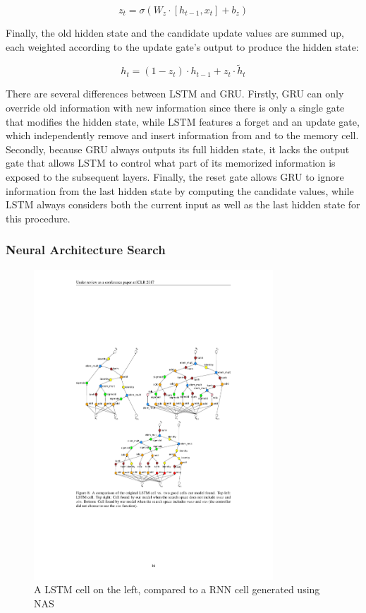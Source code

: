 \documentclass[11pt,a4paper,twoside,openright]{scrbook}
\begin{document}
\begin{equation}
z_t = \sigma (W_z \cdot [h_{t-1}, x_t] + b_z)
\end{equation}

Finally, the old hidden state and the candidate update values are summed up, each weighted according to the update gate’s output to produce the hidden state:

\begin{equation}
h_t = (1 - z_t) \cdot h_{t-1} + z_t \cdot \tilde h_t
\end{equation}

There are several differences between LSTM and GRU. Firstly, GRU can only override old information with new information since there is only a single gate that modifies the hidden state, while LSTM features a forget and an update gate, which independently remove and insert information from and to the memory cell. Secondly, because GRU always outputs its full hidden state, it lacks the output gate that allows LSTM to control what part of its memorized information is exposed to the subsequent layers. Finally, the reset gate allows GRU to ignore information from the last hidden state by computing the candidate values, while LSTM always considers both the current input as well as the last hidden state for this procedure.

\subsubsection{Neural Architecture Search}

\begin{figure}
\centering
\includegraphics[width=0.8\textwidth]{images/NAS.pdf}
\caption{A LSTM cell on the left, compared to a RNN cell generated using NAS \cite{zoph}}
\label{Figure:NAS}
\end{figure}
\end{document}
